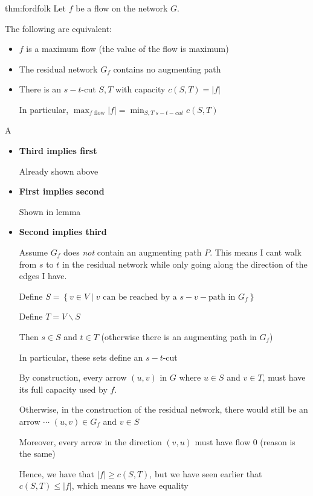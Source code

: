 \newpage
\begin{theo}{thm:fordfolk}
  Let $f$ be a flow on the network $G$.\par
  \noindent The following are equivalent:\par
  \begin{itemize}
    \item $f$ is a maximum flow (the value of the flow is maximum)\par
    \item The residual network $G_f$ contains no augmenting path\par
    \item There is an $s-t$-cut $S,T$ with capacity $c(S,T) = \left|f\right|$\par
      \noindent In particular, $\max_{f \text{ flow}}\left|f\right| = \min_{S,T\; s-t-cut}c(S,T)$ 
  \end{itemize}
\end{theo}
\par\bigskip
\begin{prf}
  A
  \begin{itemize}
    \item\textbf{Third implies first}\par
      Already shown above
      \par\bigskip
    \item\textbf{First implies second}\par
      Shown in lemma
      \par\bigskip
    \item\textbf{Second implies third}\par
      Assume $G_f$ does \textit{not} contain an augmenting path $P$. This means I cant walk from $s$ to $t$ in the residual network while only going along the direction of the edges I have.
      \par\bigskip
      Define $S = \left\{v\in V\;|\; v\text{ can be reached by a } s-v-\text{path in } G_f\right\}$\par
      Define $T = V\backslash S$
      \par\bigskip
      Then $s\in S$ and $t\in T$ (otherwise there is an augmenting path in $G_f$)\par
      In particular, these sets define an $s-t$-cut
      \par\bigskip
      By construction, every arrow $(u,v)$ in $G$ where $u\in S$ and $v\in T$, must have its full capacity used by $f$.\par
      Otherwise, in the construction of the residual network, there would still be an arrow $\cdots$ $(u,v)\in G_f$ and $v\in S$
      \par\bigskip
      Moreover, every arrow in the direction $(v,u)$  must have flow 0 (reason is the same)
      \par\bigskip
      Hence, we have that $\left|f\right|\geq c(S,T)$, but we have seen earlier that $c(S,T)\leq \left|f\right|$, which means we have equality
      \par\bigskip
  \end{itemize}
\end{prf}
